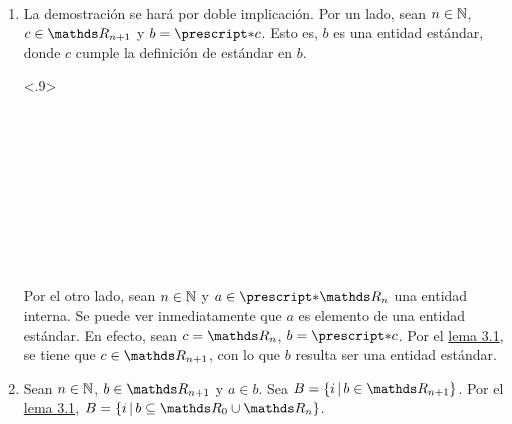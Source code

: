 \begin{demo}~
  \begin{enumerate}
    \item La demostración se hará por doble implicación. Por un lado,
          sean $n\in\mathbb{N}$, $c\in\R_{n+1}$ y $b=\st{c}$. Esto es,
          $b$ es una entidad estándar, donde $c$ cumple la definición
          de estándar en $b$.
          \begin{longderivation}<.9>
              \\
            \equiv\\
              \\
            \equiv\\
              \\
            \\
              \\
            \\
              \\
            \To\\
          \end{longderivation}
          Por el otro lado, sean $n\in\mathbb{N}$ y $a\in\st{\R_n}$ una entidad
          interna. Se puede ver inmediatamente que $a$ es elemento de
          una entidad estándar. En efecto, sean $c=\R_n$, $b=\st{c}$.
          Por el \hyperref[lema:Rn]{lema 3.1}, se tiene que
          $c\in\R_{n+1}$, con lo que $b$ resulta ser una entidad estándar.
    \item Sean $n\in\mathbb{N}$, $b\in\R_{n+1}$ y $a\in b$.
          Sea $B=\set{i}{b\in\R_{n+1}}$. Por el
          \hyperref[lema:Rn]{lema 3.1},
          $B=\set{i}{b\subseteq \R_0\cup\R_n}$.
          \begin{longderivation}
              \\
            \To\\
              \\
            \equiv\\
              \\
            \\
              \\
            \To\\
          \end{longderivation}
  \end{enumerate}
\end{demo}

